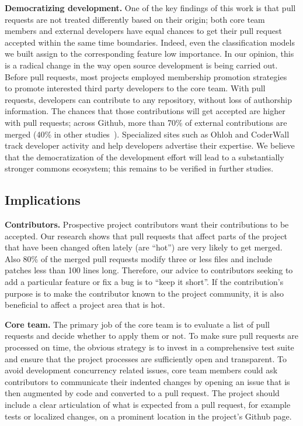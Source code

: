 \documentclass{sig-alternate}
\begin{document}
%
\textbf{Democratizing development.} One of the key findings of this work is
that pull requests are not treated differently based on their origin; both core
team members and external developers have equal chances to get their pull
request accepted within the same time boundaries. Indeed, even the
classification models we built assign to the corresponding feature low
importance. In our opinion, this is a radical change in the way open source
development is being carried out. Before pull requests, most projects employed
membership promotion strategies~\cite{Jense07} to promote interested third party
developers to the core team. With pull requests, developers can contribute to
any repository, without loss of authorship information. The chances that those
contributions will get accepted are higher with pull requests; across Github, more than 70\% of external contributions are merged
(40\% in other studies~\cite{Rigby06, Weiss08}). Specialized sites such as
Ohloh and CoderWall track developer activity and help developers advertise their
expertise. We believe that the democratization of the development effort will
lead to a substantially stronger commons ecosystem; this remains to be
verified in further studies.

\subsection{Implications}

\textbf{Contributors.} Prospective project contributors want their contributions
to be accepted. Our research shows that pull requests that affect parts of the
project that  have been changed often lately (are ``hot'') are very likely to
get merged. Also 80\% of the merged pull requests modify three or less files and
include patches less than 100 lines long. Therefore, our advice to contributors
seeking to add a particular feature or fix a bug is to ``keep it short''. If the
contribution's purpose is to make the contributor known to the project
community, it is also beneficial to affect a project area that is hot.

\textbf{Core team.} The primary job of the core team is to evaluate a list of
pull requests and decide whether to apply them or not. To make sure pull
requests are processed on time, the obvious strategy is to invest in a
comprehensive test suite and ensure that the project processes are sufficiently open and transparent. To avoid development concurrency related issues, core
team members could ask contributors to communicate their indented changes by
opening an issue that is then augmented by code and converted to a pull
request. The project should include a clear articulation of what is expected
from a pull request, for example tests or localized changes, on a prominent
location in the project's Github page.
\end{document}
